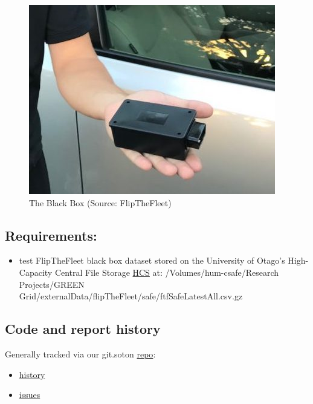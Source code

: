 \documentclass[]{article}
\providecommand{\tightlist}{%
  \setlength{\itemsep}{0pt}\setlength{\parskip}{0pt}}
\begin{document}
\begin{figure}

\hfill{}\includegraphics[width=4.24in]{fig/bb} 

\caption{The Black Box (Source: FlipTheFleet)}\label{fig:blackBox}
\end{figure}

\subsection{Requirements:}\label{requirements}

\begin{itemize}
\tightlist
\item
  test FlipTheFleet black box dataset stored on the University of
  Otago's High-Capacity Central File Storage
  \href{https://www.otago.ac.nz/its/services/hosting/otago068353.html}{HCS}
  at: /Volumes/hum-csafe/Research Projects/GREEN
  Grid/externalData/flipTheFleet/safe/ftfSafeLatestAll.csv.gz
\end{itemize}

\subsection{Code and report history}\label{code-and-report-history}

Generally tracked via our git.soton
\href{https://git.soton.ac.uk/ba1e12/nzGREENGrid}{repo}:

\begin{itemize}
\tightlist
\item
  \href{https://git.soton.ac.uk/ba1e12/nzGREENGrid/commits/master}{history}
\item
  \href{https://git.soton.ac.uk/ba1e12/nzGREENGrid/issues}{issues}
\end{itemize}
\end{document}
